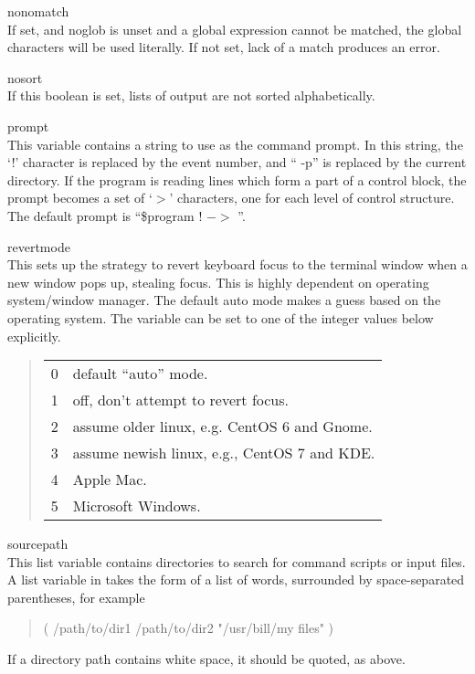 \begin{description}
\item{\et nonomatch}\\
If set, and {\et noglob} is unset and a global expression cannot be
matched, the global characters will be used literally.  If not set,
lack of a match produces an error.

\item{\et nosort}\\
If this boolean is set, lists of output are not sorted alphabetically.

\item{\et prompt}\\
This variable contains a string to use as the command prompt.  In this
string, the `!' character is replaced by the event number, and ``{\vt
-p}'' is replaced by the current directory.  If the program is reading
lines which form a part of a control block, the prompt becomes a set
of `$>$' characters, one for each level of control structure.  The
default prompt is ``{\vt \$program !  $->$ }''.

\item{\et revertmode}\\
This sets up the strategy to revert keyboard focus to the terminal
window when a new window pops up, stealing focus.  This is highly
dependent on operating system/window manager.  The default auto mode
makes a guess based on the operating system.  The variable can be set
to one of the integer values below explicitly.
\begin{quote}
\begin{tabular}{ll}
0 & default ``auto'' mode.\\
1 & off, don't attempt to revert focus.\\
2 & assume older linux, e.g. CentOS 6 and Gnome.\\
3 & assume newish linux, e.g., CentOS 7 and KDE.\\
4 & Apple Mac.\\
5 & Microsoft Windows.\\
\end{tabular}
\end{quote}

\item{\et sourcepath}\\
This list variable contains directories to search for command scripts
or input files.  A list variable in {\WRspice} takes the form of a
list of words, surrounded by space-separated parentheses, for example
\begin{quote}\vt
( /path/to/dir1 /path/to/dir2 "/usr/bill/my files" )
\end{quote}
If a directory path contains white space, it should be quoted, as
above.


\end{description}
